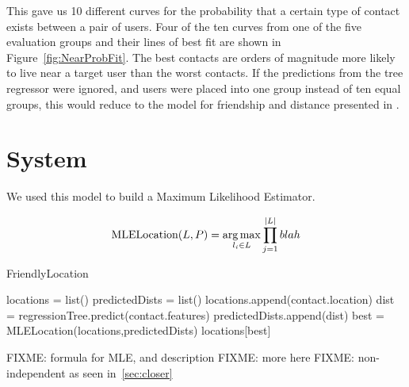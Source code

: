 This gave us 10 different curves for the probability that a certain type of
contact exists between a pair of users.
%
Four of the ten curves from one of the five evaluation groups and their lines
of best fit are shown in Figure~\ref{fig:NearProbFit}.
%
The best contacts are orders of magnitude more
likely to live near a target user than the worst contacts.
%
If the predictions from the tree regressor were ignored, and users were placed
into one group instead of ten equal groups, this would reduce to the model
for friendship and distance presented in \cite{backstrom2010find}.


\section{System}
We used this model to build a Maximum Likelihood Estimator.

\[
    \operatorname{MLELocation}(L,P) = \operatorname*{arg\,max}_{l_i \in L}
    \prod_{j=1}^{|L|} blah
\]

\begin{algorithm}
  \caption{FriendlyLocation \label{alg:friendloc}}
  \begin{algorithmic}[0]
  \State locations = list()
  \State predictedDists = list()
        \State \Continue
      \EndIf
      \State locations.append(contact.location)
      \State dist = regressionTree.predict(contact.features)
      \State predictedDists.append(dist)
  \EndFor
  \State best = MLELocation(locations,predictedDists)
  \State \Return locations[best]
  \end{algorithmic}
\end{algorithm}

FIXME: formula for MLE, and description
FIXME: more here
FIXME: non-independent as seen in~\ref{sec:closer}


